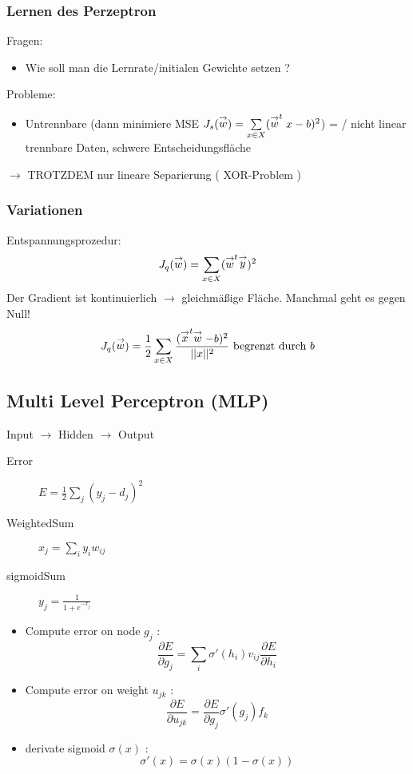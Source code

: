 \subsubsection*{Lernen des Perzeptron}

Fragen:
\begin{itemize}
\item Wie soll man die Lernrate/initialen Gewichte setzen ?
\end{itemize}
Probleme:
\begin{itemize}
\item Untrennbare (dann minimiere MSE $J_s(\stackrel{\to}{w}) = \sum\limits_{x \in X} (\stackrel{\to}{w}^t x - b)^2$) =  / nicht linear trennbare Daten, schwere Entscheidungsfläche
\end{itemize}

$\to$ TROTZDEM nur lineare Separierung ( XOR-Problem )

\subsubsection*{Variationen}

Entspannungsprozedur: $$J_q(\stackrel{\to}{w}) = \sum\limits_{x \in X} (\stackrel{\to}{w}^t \stackrel{\to}{y})^2$$
Der Gradient ist kontinuierlich $\to$ gleichmäßige Fläche. Manchmal geht es gegen Null!
$$J_q(\stackrel{\to}{w}) = \frac{1}{2} \sum\limits_{x \in X} \frac{(\stackrel{\to}{x}^t\stackrel{\to}{w} - b)^2}{||x||^2} \textrm{ begrenzt durch } b$$

\subsection{Multi Level Perceptron (MLP)}

Input $\to$ Hidden $\to$ Output

\begin{description}
	\item[Error] $E = \frac{1}{2} \sum_j(y_j - d_j)^2$
	\item[WeightedSum] $x_j = \sum_i y_i w_{ij}$
	\item[sigmoidSum] $y_j = \frac{1}{1 + e^{-x_j}}$
\end{description}

\begin{itemize}
	\item Compute error on node $g_j$ : $$\frac{\partial E}{\partial g_j} = \sum_i \sigma'(h_i) v_{ij} \frac{\partial E}{\partial h_i}$$
	\item Compute error on weight $u_{jk}$ : $$\frac{\partial E}{\partial u_{jk}} = \frac{\partial E}{\partial g_j} \sigma'(g_j)f_k$$
	\item derivate sigmoid $\sigma(x)$ : $$\sigma'(x) = \sigma(x) (1 - \sigma(x))$$
\end{itemize}

